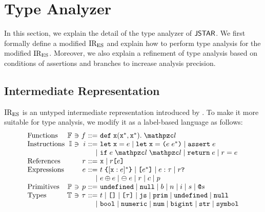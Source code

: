 \section{Type Analyzer}\label{sec:analyzer}

In this section, we explain the detail of the type analyzer of $\textsf{JSTAR}$. We first
formally define a modified ${\text{IR}_\text{ES}}$ and explain how to perform type analysis for
the modified ${\text{IR}_\text{ES}}$.  Moreover, we also explain a refinement of type analysis
based on conditions of assertions and branches to increase analysis precision.

\subsection{Intermediate Representation}\label{sec:ires}

${\text{IR}_\text{ES}}$ is an untyped intermediate representation introduced by \citet{jiset}.
To make it more suitable for type analysis, we modify it as a label-based
language as follows:
\small
\[
  \begin{array}{l@{~}r@{~}c@{~}r@{~}r@{~}l}
    \text{Functions}
    &\funcset&\ni&\func&::=&\kwdef \; \x (\x^*, \x^*). \; \lab\\

    \text{Instructions}
    &\instset&\ni&\inst&::=&
    \kwlet \; \x = \expr \mid
    \kwlet \; \x = \kwrl \expr \; \expr^* \kwrr \mid
    \kwassert \; \expr \\

    &&&&\mid&
    \kwif \; \expr \; \lab \; \lab \mid
    \kwreturn \; \expr \mid
    \refer = \expr \\

    \text{References}
    &&&\refer&::=&
    \x \mid
    \refer \kwsl \expr \kwsr \\

    \text{Expressions}
    &&&\expr&::=&
    \tname \; \kwcl [\x: \expr]^* \kwcr \mid
    \clist{\expr^*} \mid
    \expr: \ty \mid
    \refer \kwexists \\

    &&&&\mid&
    \expr \bop \expr \mid
    \uop \; \expr \mid
    \refer \mid
    \const \mid
    \prim \\

    \text{Primitives}
    &\primset&\ni&\prim&::=&
    \undefval \mid \nullval \mid \bool \mid
    \num \mid \bigint \mid \str \mid \symb \\

    \text{Types}
    &\tyset&\ni&\ty&::=&\tname \mid \clist{} \mid \clist{\ty} \mid \tjs \mid
    \tprim \mid \undefval \mid \nullval\\

    &&&&\mid&
    \tbool \mid \tnumeric \mid \tnum \mid \tbigint \mid \tstr \mid \tsymb \\
  \end{array}
\]
